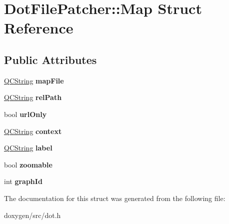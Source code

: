 \hypertarget{struct_dot_file_patcher_1_1_map}{}\section{Dot\+File\+Patcher\+::Map Struct Reference}
\label{struct_dot_file_patcher_1_1_map}
\subsection*{Public Attributes}
\begin{DoxyCompactItemize}
\item 
\mbox{\label{struct_dot_file_patcher_1_1_map_aec1d56210a55b5bae168f4492d786b6a}} 
\mbox{\hyperlink{class_q_c_string}{Q\+C\+String}} {\bfseries map\+File}
\item 
\mbox{\label{struct_dot_file_patcher_1_1_map_a1039cf6923ea60a919d092990d86bb07}} 
\mbox{\hyperlink{class_q_c_string}{Q\+C\+String}} {\bfseries rel\+Path}
\item 
\mbox{\label{struct_dot_file_patcher_1_1_map_a4e0032ccbfd53bb27adc4d0252da9a6f}} 
bool {\bfseries url\+Only}
\item 
\mbox{\label{struct_dot_file_patcher_1_1_map_acd850ca81fb232e7b253746937702e66}} 
\mbox{\hyperlink{class_q_c_string}{Q\+C\+String}} {\bfseries context}
\item 
\mbox{\label{struct_dot_file_patcher_1_1_map_a7aa1ae8828fec8377ddf808132a52f24}} 
\mbox{\hyperlink{class_q_c_string}{Q\+C\+String}} {\bfseries label}
\item 
\mbox{\label{struct_dot_file_patcher_1_1_map_a8e657340f36c6d423a2c0d1e417b3407}} 
bool {\bfseries zoomable}
\item 
\mbox{\label{struct_dot_file_patcher_1_1_map_a1bf5d3f2543719b345339e1ec307f24e}} 
int {\bfseries graph\+Id}
\end{DoxyCompactItemize}


The documentation for this struct was generated from the following file\+:\begin{DoxyCompactItemize}
\item 
doxygen/src/dot.\+h\end{DoxyCompactItemize}
